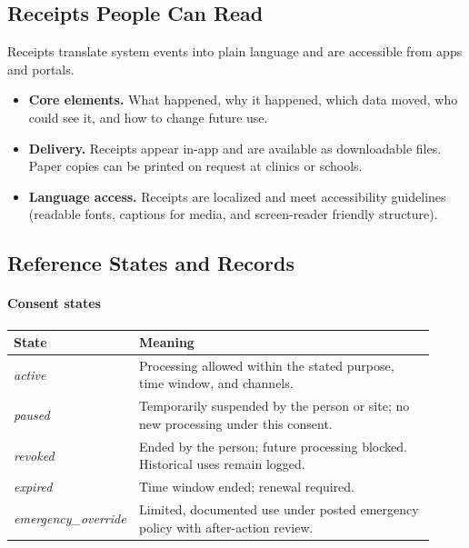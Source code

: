 \documentclass[12pt]{article}
\begin{document}
\subsection*{Receipts People Can Read}
Receipts translate system events into plain language and are accessible from apps and portals.
\begin{itemize}[leftmargin=*]
  \item \textbf{Core elements.} What happened, why it happened, which data moved, who could see it, and how to change future use.
  \item \textbf{Delivery.} Receipts appear in-app and are available as downloadable files. Paper copies can be printed on request at clinics or schools.
  \item \textbf{Language access.} Receipts are localized and meet accessibility guidelines (readable fonts, captions for media, and screen-reader friendly structure).
\end{itemize}

\subsection*{Reference States and Records}
\paragraph{Consent states}
\begin{longtable}{@{}p{0.22\linewidth}p{0.70\linewidth}@{}}
\toprule
\textbf{State} & \textbf{Meaning} \\
\midrule
\endhead
\textit{active} & Processing allowed within the stated purpose, time window, and channels. \\
\textit{paused} & Temporarily suspended by the person or site; no new processing under this consent. \\
\textit{revoked} & Ended by the person; future processing blocked. Historical uses remain logged. \\
\textit{expired} & Time window ended; renewal required. \\
\textit{emergency\_override} & Limited, documented use under posted emergency policy with after-action review. \\
\bottomrule
\end{longtable}
\end{document}
